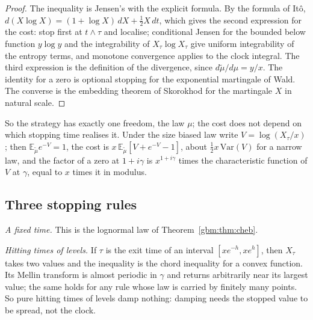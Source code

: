 \begin{proof}
The inequality is Jensen's with the explicit formula. By the formula of It\^o, $d(X\log X)=(1+\log X)\,dX+\frac12X\,dt$, which gives the second expression for the cost: stop first at $t\wedge\tau$ and localise; conditional Jensen for the bounded below function $y\log y$ and the integrability of $X_\tau\log X_\tau$ give uniform integrability of the entropy terms, and monotone convergence applies to the clock integral. The third expression is the definition of the divergence, since $d\tilde\mu/d\mu=y/x$. The identity for a zero is optional stopping for the exponential martingale of Wald. The converse is the embedding theorem of Skorokhod for the martingale $X$ in natural scale.
\end{proof}

So the strategy has exactly one freedom, the law $\mu$; the cost does not depend on which stopping time realises it. Under the size biased law write $V=\log(X_\tau/x)$; then $\mathbb E_{\tilde\mu}e^{-V}=1$, the cost is $x\,\mathbb E_{\tilde\mu}[V+e^{-V}-1]$, about $\frac12x\,\mathrm{Var}(V)$ for a narrow law, and the factor of a zero at $1+i\gamma$ is $x^{1+i\gamma}$ times the characteristic function of $V$ at $\gamma$, equal to $x$ times it in modulus.

\subsection{Three stopping rules}

\emph{A fixed time.} This is the lognormal law of Theorem~\ref{gbm:thm:cheb}.

\emph{Hitting times of levels.} If $\tau$ is the exit time of an interval $[xe^{-h},xe^{h}]$, then $X_\tau$ takes two values and the inequality is the chord inequality for a convex function. Its Mellin transform is almost periodic in $\gamma$ and returns arbitrarily near its largest value; the same holds for any rule whose law is carried by finitely many points. So pure hitting times of levels damp nothing: damping needs the stopped value to be spread, not the clock.

